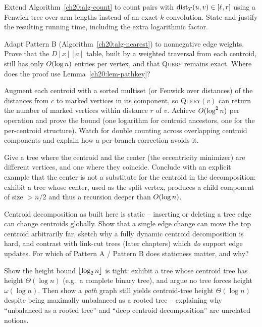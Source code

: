 \begin{exercise}
Extend Algorithm~\ref{ch20:alg-count} to count pairs with $\operatorname{dist}_T(u,v)\in[\ell,r]$
using a Fenwick tree over arm lengths instead of an exact-$k$ convolution. State
and justify the resulting running time, including the extra logarithmic factor.
\end{exercise}

\begin{exercise}
Adapt Pattern B (Algorithm~\ref{ch20:alg-nearest}) to nonnegative edge weights.
Prove that the $D[x][a]$ table, built by a weighted traversal from each centroid,
still has only $O(\log n)$ entries per vertex, and that \textsc{Query} remains
exact. Where does the proof use Lemma~\ref{ch20:lem-pathkey}?
\end{exercise}

\begin{exercise}
Augment each centroid with a sorted multiset (or Fenwick over distances) of the
distances from $c$ to marked vertices in its component, so \textsc{Query}$(v)$ can
return the number of marked vertices within distance $r$ of $v$. Achieve
$O(\log^2 n)$ per operation and prove the bound (one logarithm for centroid
ancestors, one for the per-centroid structure). Watch for double counting across
overlapping centroid components and explain how a per-branch correction avoids it.
\end{exercise}

\begin{exercise}
Give a tree where the centroid and the center (the eccentricity minimizer) are
different vertices, and one where they coincide. Conclude with an explicit example
that the center is not a substitute for the centroid in the decomposition: exhibit
a tree whose center, used as the split vertex, produces a child component of size
$>n/2$ and thus a recursion deeper than $O(\log n)$.
\end{exercise}

\begin{exercise}
Centroid decomposition as built here is static -- inserting or deleting a tree edge
can change centroids globally. Show that a single edge change can move the top
centroid arbitrarily far, sketch why a fully dynamic centroid decomposition is
hard, and contrast with link-cut trees (later chapters) which \emph{do} support
edge updates. For which of Pattern A / Pattern B does staticness matter, and why?
\end{exercise}

\begin{exercise}
Show the height bound $\lfloor\log_2 n\rfloor$ is tight: exhibit a tree whose
centroid tree has height $\Theta(\log n)$ (e.g.\ a complete binary tree), and argue
no tree forces height $\omega(\log n)$. Then show a \emph{path} graph still yields
centroid-tree height $\Theta(\log n)$ despite being maximally unbalanced as a
rooted tree -- explaining why ``unbalanced as a rooted tree'' and ``deep centroid
decomposition'' are unrelated notions.
\end{exercise}
